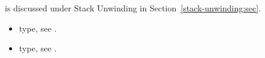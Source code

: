 \descr
{} is discussed under Stack Unwinding in
Section~\ref{stack-unwinding:sec}.

\argdesc

\crossreferences
\begin{itemize}
	\item {} type, see .
	\item {} type, see .
\end{itemize}

%

%
